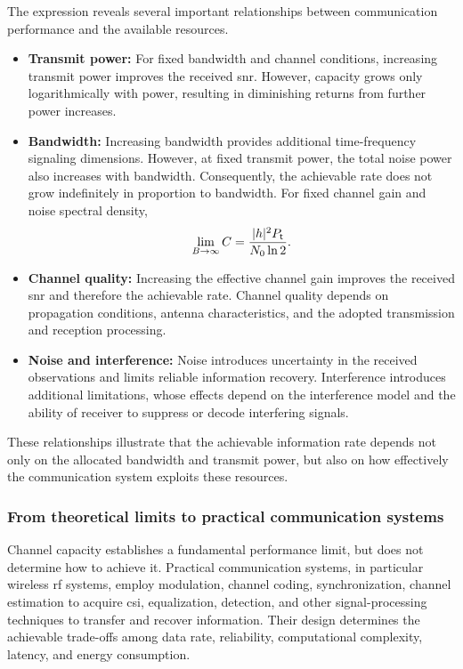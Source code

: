 \vspace{10pt}
The expression reveals several important relationships between
communication performance and the available resources.
\begin{itemize}
	\item \textbf{Transmit power:}
	For fixed bandwidth and channel conditions, increasing
	transmit power improves the received \ac{snr}. However, capacity grows only logarithmically with
	power, resulting in diminishing returns from further
	power increases.
	
	\item \textbf{Bandwidth:}
	Increasing bandwidth provides additional time-frequency
	signaling dimensions. However, at fixed transmit power,
	the total noise power also increases with bandwidth.
	Consequently, the achievable rate does not grow indefinitely
	in proportion to bandwidth. For fixed channel gain and
	noise spectral density,
	\begin{equation}
		\lim_{B\rightarrow\infty} C
		=
		\frac{|h|^2P_{\mathsf{t}}}{N_{0}\ln 2}.
		\label{eq:siso_capacity_bw_limit}
	\end{equation}
	
	\item \textbf{Channel quality:}
	Increasing the effective channel gain improves the received
	\ac{snr} and therefore the achievable rate. Channel quality
	depends on propagation conditions, antenna characteristics,
	and the adopted transmission and reception processing.
	
	\item \textbf{Noise and interference:}
	Noise introduces uncertainty in the received observations
	and limits reliable information recovery. Interference
	introduces additional limitations, whose effects depend
	on the interference model and the   ability of  receiver to
	suppress or decode interfering signals.
\end{itemize}
%
These relationships illustrate that the achievable information
rate depends not only on the allocated bandwidth and transmit
power, but also on how effectively the communication system
exploits these resources.


\subsubsection*{From theoretical limits to practical communication systems}

Channel capacity establishes a fundamental performance limit,
but does not determine how to achieve it. Practical communication 
systems, in particular wireless \ac{rf} systems,  employ modulation, channel coding, synchronization,
 channel estimation to acquire \ac{csi}, equalization, detection, and other
signal-processing techniques to transfer and recover information.
Their design determines the achievable trade-offs among data
rate, reliability, computational complexity, latency, and
energy consumption.

